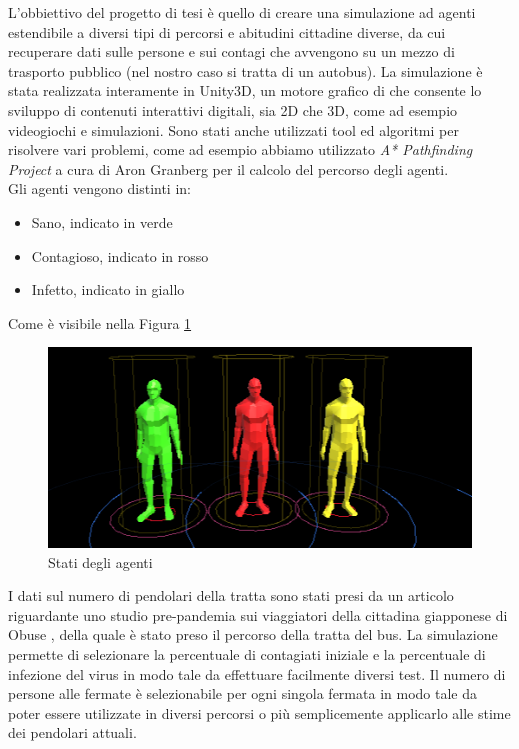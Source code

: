 \documentclass[12pt, openany]{book}
\begin{document}
		L'obbiettivo del progetto di tesi è quello di creare una simulazione ad agenti estendibile a diversi tipi di percorsi e abitudini cittadine diverse, da cui recuperare dati sulle persone e sui contagi che avvengono su un mezzo di trasporto pubblico (nel nostro caso si tratta di un autobus). La simulazione è stata realizzata interamente in Unity3D, un motore grafico di che consente lo sviluppo di contenuti interattivi digitali, sia 2D che 3D, come ad esempio videogiochi e simulazioni. Sono stati anche utilizzati tool ed algoritmi per risolvere  vari problemi, come ad esempio abbiamo utilizzato \emph{A* Pathfinding Project} a cura di Aron Granberg per il calcolo del percorso degli agenti. 
		\\Gli agenti vengono distinti in:
		\begin{itemize}
			\item Sano, indicato in verde
			\item Contagioso, indicato in rosso
			\item Infetto, indicato in giallo
			
		\end{itemize} 
		Come è visibile nella Figura \ref{fig:agenti}
	\begin{figure}[H]
		\centering
		\includegraphics[width=1\linewidth]{"Immagini/Agenti"}
		\caption{Stati degli agenti}
		\label{fig:agenti}
	\end{figure}		
		I dati sul numero di pendolari della tratta sono stati presi da un articolo riguardante uno studio pre-pandemia sui viaggiatori della cittadina giapponese di Obuse \cite{Obuse}, della quale è stato preso il percorso della tratta del bus. La simulazione permette di selezionare la percentuale di contagiati iniziale e la percentuale di infezione del virus in modo tale da effettuare facilmente diversi test. Il numero di persone alle fermate è selezionabile per ogni singola fermata in modo tale da poter essere utilizzate in diversi percorsi o più semplicemente applicarlo alle stime dei pendolari attuali.\\
\end{document}
